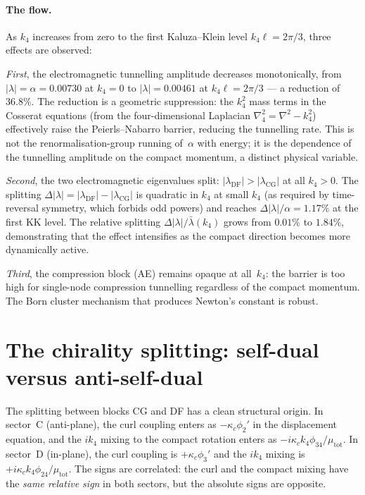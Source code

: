 \paragraph{The flow.}  As $k_4$ increases from zero to the first Kaluza--Klein level $k_4\ell = 2\pi/3$, three effects are observed:

\textit{First}, the electromagnetic tunnelling amplitude decreases monotonically, from $|\lambda| = \alpha = 0.00730$ at $k_4 = 0$ to $|\lambda| = 0.00461$ at $k_4\ell = 2\pi/3$ --- a reduction of $36.8\%$.  The reduction is a geometric suppression: the $k_4^2$ mass terms in the Cosserat equations (from the four-dimensional Laplacian $\nabla_4^2 = \nabla^2 - k_4^2$) effectively raise the Peierls--Nabarro barrier, reducing the tunnelling rate.  This is not the renormalisation-group running of~$\alpha$ with energy; it is the dependence of the tunnelling amplitude on the compact momentum, a distinct physical variable.

\textit{Second}, the two electromagnetic eigenvalues split: $|\lambda_{\text{DF}}| > |\lambda_{\text{CG}}|$ at all $k_4 > 0$.  The splitting $\Delta|\lambda| = |\lambda_{\text{DF}}| - |\lambda_{\text{CG}}|$ is quadratic in $k_4$ at small $k_4$ (as required by time-reversal symmetry, which forbids odd powers) and reaches $\Delta|\lambda|/\alpha = 1.17\%$ at the first KK level.  The relative splitting $\Delta|\lambda|/\bar{\lambda}(k_4)$ grows from $0.01\%$ to $1.84\%$, demonstrating that the effect intensifies as the compact direction becomes more dynamically active.

\textit{Third}, the compression block (AE) remains opaque at all~$k_4$: the barrier is too high for single-node compression tunnelling regardless of the compact momentum.  The Born cluster mechanism that produces Newton's constant is robust.


\section{The chirality splitting: self-dual versus anti-self-dual}
\label{sec:chirality_splitting}

The splitting between blocks CG and DF has a clean structural origin.  In sector~C (anti-plane), the curl coupling enters as $-\kappa_c\phi_2'$ in the displacement equation, and the $ik_4$ mixing to the compact rotation enters as $-i\kappa_c k_4\phi_{34}/\mu_{\text{tot}}$.  In sector~D (in-plane), the curl coupling is $+\kappa_c\phi_3'$ and the $ik_4$ mixing is $+i\kappa_c k_4\phi_{24}/\mu_{\text{tot}}$.  The signs are correlated: the curl and the compact mixing have the \textit{same relative sign} in both sectors, but the absolute signs are opposite.

